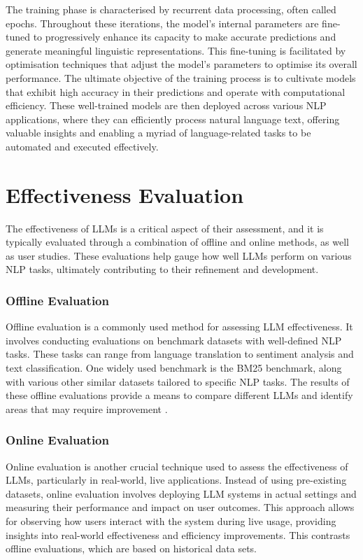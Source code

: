 The training phase is characterised by recurrent data processing, often called epochs. Throughout these iterations, the model's internal parameters are fine-tuned to progressively enhance its capacity to make accurate predictions and generate meaningful linguistic representations. This fine-tuning is facilitated by optimisation techniques that adjust the model's parameters to optimise its overall performance. The ultimate objective of the training process is to cultivate models that exhibit high accuracy in their predictions and operate with computational efficiency. These well-trained models are then deployed across various NLP applications, where they can efficiently process natural language text, offering valuable insights and enabling a myriad of language-related tasks to be automated and executed effectively.

\section{Effectiveness Evaluation}
The effectiveness of LLMs is a critical aspect of their assessment, and it is typically evaluated through a combination of offline and online methods, as well as user studies. These evaluations help gauge how well LLMs perform on various NLP tasks, ultimately contributing to their refinement and development.

\subsubsection{Offline Evaluation}
Offline evaluation is a commonly used method for assessing LLM effectiveness. It involves conducting evaluations on benchmark datasets with well-defined NLP tasks. These tasks can range from language translation to sentiment analysis and text classification. One widely used benchmark is the BM25 benchmark, along with various other similar datasets tailored to specific NLP tasks. The results of these offline evaluations provide a means to compare different LLMs and identify areas that may require improvement \cite{penha2022}.

\subsubsection{Online Evaluation}
Online evaluation is another crucial technique used to assess the effectiveness of LLMs, particularly in real-world, live applications. Instead of using pre-existing datasets, online evaluation involves deploying LLM systems in actual settings and measuring their performance and impact on user outcomes. This approach allows for observing how users interact with the system during live usage, providing insights into real-world effectiveness and efficiency improvements. This contrasts offline evaluations, which are based on historical data sets.

